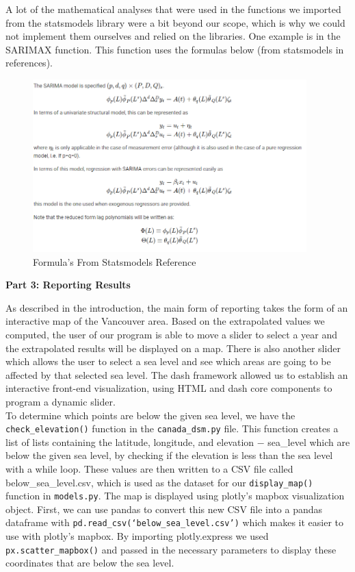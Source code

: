 \documentclass[fontsize=11pt]{article}
\begin{document}
    A lot of the mathematical analyses that were used in the functions we imported from the statsmodels library were a bit beyond our scope, which is why we could not implement them ourselves and relied on the libraries. One example is in the SARIMAX function. This function uses the formulas below (from statsmodels in references).

    \begin{figure}[h]
        \centering
        \includegraphics[width=300pt]{sarima_equations.png}
        \caption{Formula's From Statsmodels Reference}
    \end{figure}

    \newpage


    \textbf{Part 3: Reporting Results}

    \hspace{\parindent}As described in the introduction, the main form of reporting takes the form of an interactive map of the Vancouver area. Based on the extrapolated values we computed, the user of our program is able to move a slider to select a year and the extrapolated results will be displayed on a map. There is also another slider which allows the user to select a sea level and see which areas are going to be affected by that selected sea level. The dash framework allowed us to establish an interactive front-end visualization, using HTML and dash core components to program a dynamic slider. \\

    To determine which points are below the given sea level, we have the \texttt{check\_elevation()} function in the \texttt{canada\_dsm.py} file. This function creates a list of lists containing the latitude, longitude, and elevation $-$ sea\_level which are below the given sea level, by checking if the elevation is less than the sea level with a while loop. These values are then written to a CSV file called below\_sea\_level.csv, which is used as the dataset for our \texttt{display\_map()} function in \texttt{models.py}. The map is displayed using plotly’s mapbox visualization object. First, we can use pandas to convert this new CSV file into a pandas dataframe with \texttt{pd.read\_csv(‘below\_sea\_level.csv’)} which makes it easier to use with plotly’s mapbox. By importing plotly.express we used \texttt{px.scatter\_mapbox()} and passed in the necessary parameters to display these coordinates that are below the sea level. \\
\end{document}
